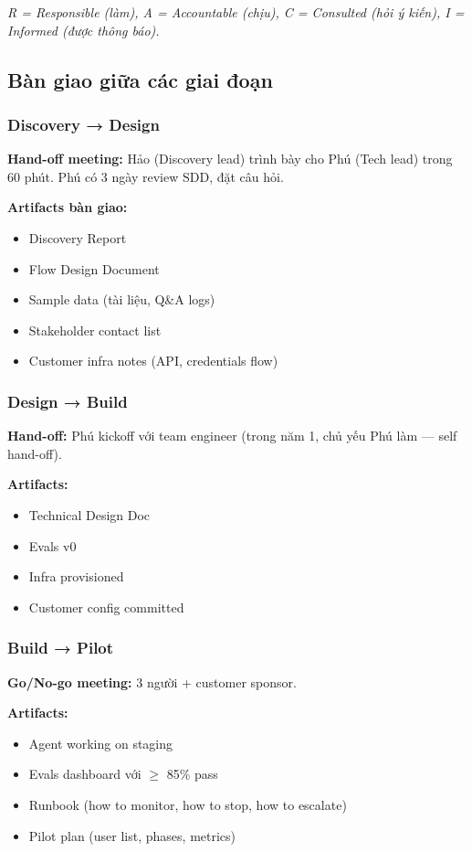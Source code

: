 \documentclass[11pt,a4paper]{article}
\begin{document}
\textit{R = Responsible (làm), A = Accountable (chịu), C = Consulted (hỏi ý kiến), I = Informed (được thông báo).}

\subsection{Bàn giao giữa các giai đoạn}

\subsubsection*{Discovery → Design}
\textbf{Hand-off meeting:} Hảo (Discovery lead) trình bày cho Phú (Tech lead) trong 60 phút. Phú có 3 ngày review SDD, đặt câu hỏi.

\textbf{Artifacts bàn giao:}
\begin{itemize}
\item Discovery Report
\item Flow Design Document
\item Sample data (tài liệu, Q\&A logs)
\item Stakeholder contact list
\item Customer infra notes (API, credentials flow)
\end{itemize}

\subsubsection*{Design → Build}
\textbf{Hand-off:} Phú kickoff với team engineer (trong năm 1, chủ yếu Phú làm --- self hand-off).

\textbf{Artifacts:}
\begin{itemize}
\item Technical Design Doc
\item Evals v0
\item Infra provisioned
\item Customer config committed
\end{itemize}

\subsubsection*{Build → Pilot}
\textbf{Go/No-go meeting:} 3 người + customer sponsor.

\textbf{Artifacts:}
\begin{itemize}
\item Agent working on staging
\item Evals dashboard với $\geq$ 85\% pass
\item Runbook (how to monitor, how to stop, how to escalate)
\item Pilot plan (user list, phases, metrics)
\end{itemize}
\end{document}
